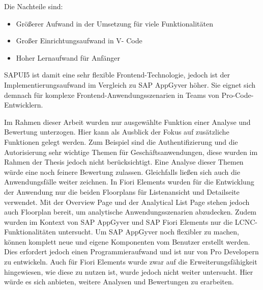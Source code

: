 Die Nachteile sind:
\begin{itemize}[noitemsep]
\item Größerer Aufwand in der Umsetzung für viele Funktionalitäten
\item Großer Einrichtungsaufwand in V- Code
\item Hoher Lernaufwand für Anfänger
\end{itemize}

SAPUI5 ist damit eine sehr flexible Frontend-Technologie, jedoch ist der Implementierungsaufwand im Vergleich zu SAP AppGyver höher. Sie eignet sich demnach für komplexe Frontend-Anwendungsszenarien in Teams von Pro-Code-Entwicklern.

Im Rahmen dieser Arbeit wurden nur ausgewählte Funktion einer Analyse und Bewertung unterzogen. Hier kann als Ausblick der Fokus auf zusätzliche Funktionen gelegt werden. Zum Beispiel sind die Authentifizierung und die Autorisierung sehr wichtige Themen für Geschäftsanwendungen, diese wurden im Rahmen der Thesis jedoch nicht berücksichtigt. Eine Analyse dieser Themen würde eine noch feinere Bewertung zulassen. Gleichfalls ließen sich auch die Anwendungsfälle weiter zeichnen. In Fiori Elements wurden für die Entwicklung der Anwendung nur die beiden Floorplans für Listenansicht und Detailseite verwendet. Mit der Overview Page und der Analytical List Page stehen jedoch auch Floorplan bereit, um analytische Anwendungsszenarien abzudecken. Zudem wurden im Kontext von SAP AppGyver und SAP Fiori Elements nur die LCNC-Funktionalitäten untersucht. Um SAP AppGyver noch flexibler zu machen, können komplett neue und eigene Komponenten vom Benutzer erstellt werden. Dies erfordert jedoch einen Programmieraufwand und ist nur von Pro Developern zu entwickeln. Auch für Fiori Elements wurde zwar auf die Erweiterungsfähigkeit hingewiesen, wie diese zu nutzen ist, wurde jedoch nicht weiter untersucht. Hier würde es sich anbieten, weitere Analysen und Bewertungen zu erarbeiten.


